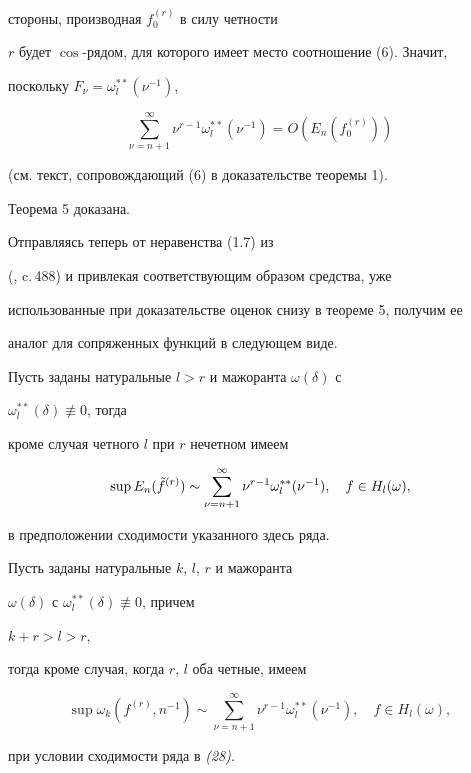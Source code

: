 стороны, производная $f^{(r)}_0$ в силу четности


$r$ будет $\cos$-рядом, для которого имеет место соотношение (6). Значит,


поскольку $F_\nu=\omega^{**}_l(\nu^{-1})$,


$$


\sum^\infty_{\nu=n+1}\nu^{r-1}\omega^{**}_l(\nu^{-1})


=O(E_n(f^{(r)}_0))


$$


(см. текст, сопровождающий (6) в доказательстве теоремы 1).


Теорема 5 доказана.





Отправляясь теперь от неравенства (1.7) из


(\cite{Bar}, c.\,488) и привлекая соответствующим образом средства, уже


использованные при доказательстве оценок снизу в теореме 5, получим ее


аналог для сопряженных функций в следующем виде.





\begin{thm}


Пусть заданы натуральные $l>r$ и мажоранта $\omega(\delta)$ с


$\omega^{**}_l(\delta)\not\equiv 0$, тогда


кроме случая четного $l$ при $r$ нечетном имеем


$$


\sup E_n(\Tilde f^{(r)})\sim \sum^\infty_{\nu=n+1}\nu^{r-1}


\omega^{**}_l(\nu^{-1}),\quad f\in H_l(\omega),


$$


в предположении сходимости указанного здесь ряда.


\end{thm}





\begin{thm}


Пусть заданы натуральные $k$, $l$, $r$ и мажоранта


$\omega(\delta)$ с $\omega^{**}_l(\delta)\not\equiv 0$, причем


$k+r>l>r$,


тогда кроме случая, когда $r$, $l$ оба четные, имеем


\begin{equation}


\sup\omega_k(f^{(r)},n^{-1})\sim \sum^\infty_{\nu=n+1}


\nu^{r-1}\omega^{**}_l(\nu^{-1}),\quad f\in H_l(\omega),


\end{equation}


при условии сходимости ряда в {\em (28)}.


\end{thm}





